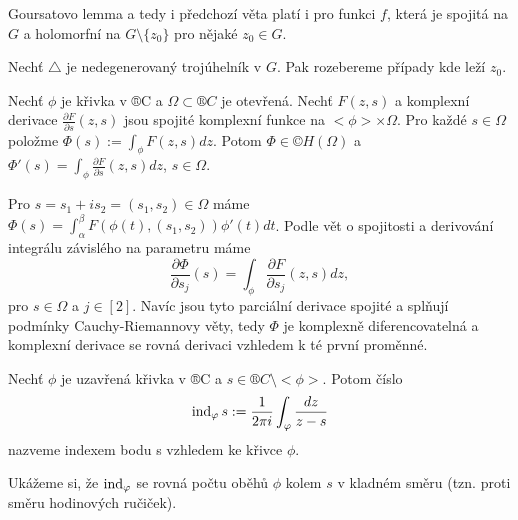 \documentclass[12pt]{article}					%
\begin{document}
\begin{poznamka}
	Goursatovo lemma a tedy i předchozí věta platí i pro funkci $f$, která je spojitá na $G$ a holomorfní na $G \setminus \{z_0\}$ pro nějaké $z_0 \in G$.

	\begin{dukazin}
		Nechť $\triangle$ je nedegenerovaný trojúhelník v $G$. Pak rozebereme případy kde leží $z_0$.
	\end{dukazin}
\end{poznamka}

\begin{veta}
	Nechť $\phi$ je křivka v ®C a $\Omega \subset ®C$ je otevřená. Nechť $F(z, s)$ a komplexní derivace $\frac{\partial F}{\partial s}(z, s)$ jsou spojité komplexní funkce na $<\phi> \times \Omega$. Pro každé $s \in \Omega$ položme $\Phi(s) := \int_\phi F(z, s) dz$. Potom $\Phi \in ©H(\Omega)$ a $\Phi'(s) = \int_\phi \frac{\partial F}{\partial s}(z, s) dz$, $s \in \Omega$.

	\begin{dukazin}
		Pro $s = s_1 + i s_2 = (s_1, s_2) \in \Omega$ máme $\Phi(s) = \int_\alpha^\beta F(\phi(t), (s_1, s_2)) \phi'(t)dt$. Podle vět o spojitosti a derivování integrálu závislého na parametru máme
		$$ \frac{\partial \Phi}{\partial s_j}(s) = \int_\phi \frac{\partial F}{\partial s_j}(z, s) dz, $$
		pro $s \in \Omega$ a $j \in [2]$. Navíc jsou tyto parciální derivace spojité a splňují podmínky Cauchy-Riemannovy věty, tedy $\Phi$ je komplexně diferencovatelná a komplexní derivace se rovná derivaci vzhledem k té první proměnné.
	\end{dukazin}
\end{veta}

\begin{definice}
	Nechť $\phi$ je uzavřená křivka v ®C a $s \in ®C \setminus <\phi>$. Potom číslo
	$$ \operatorname{ind}_\varphi s := \frac{1}{2\pi i} \int_\varphi \frac{dz}{z - s} $$
	nazveme indexem bodu s vzhledem ke křivce $\phi$.
\end{definice}

\begin{poznamka}
	Ukážeme si, že $\operatorname{ind}_\varphi$ se rovná počtu oběhů $\phi$ kolem $s$ v kladném směru (tzn. proti směru hodinových ručiček).
\end{poznamka}
\end{document}

